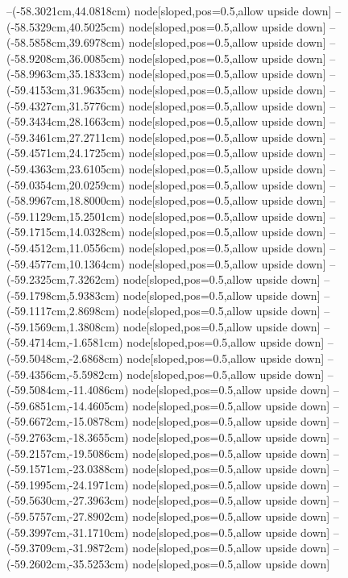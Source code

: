 --(-58.3021cm,44.0818cm) node[sloped,pos=0.5,allow upside down]{\ArrowIn}
--(-58.5329cm,40.5025cm) node[sloped,pos=0.5,allow upside down]{\ArrowIn}
--(-58.5858cm,39.6978cm) node[sloped,pos=0.5,allow upside down]{\arrowIn}
--(-58.9208cm,36.0085cm) node[sloped,pos=0.5,allow upside down]{\ArrowIn}
--(-58.9963cm,35.1833cm) node[sloped,pos=0.5,allow upside down]{\arrowIn}
--(-59.4153cm,31.9635cm) node[sloped,pos=0.5,allow upside down]{\ArrowIn}
--(-59.4327cm,31.5776cm) node[sloped,pos=0.5,allow upside down]{\arrowIn}
--(-59.3434cm,28.1663cm) node[sloped,pos=0.5,allow upside down]{\ArrowIn}
--(-59.3461cm,27.2711cm) node[sloped,pos=0.5,allow upside down]{\arrowIn}
--(-59.4571cm,24.1725cm) node[sloped,pos=0.5,allow upside down]{\ArrowIn}
--(-59.4363cm,23.6105cm) node[sloped,pos=0.5,allow upside down]{\arrowIn}
--(-59.0354cm,20.0259cm) node[sloped,pos=0.5,allow upside down]{\ArrowIn}
--(-58.9967cm,18.8000cm) node[sloped,pos=0.5,allow upside down]{\ArrowIn}
--(-59.1129cm,15.2501cm) node[sloped,pos=0.5,allow upside down]{\ArrowIn}
--(-59.1715cm,14.0328cm) node[sloped,pos=0.5,allow upside down]{\ArrowIn}
--(-59.4512cm,11.0556cm) node[sloped,pos=0.5,allow upside down]{\ArrowIn}
--(-59.4577cm,10.1364cm) node[sloped,pos=0.5,allow upside down]{\arrowIn}
--(-59.2325cm,7.3262cm) node[sloped,pos=0.5,allow upside down]{\ArrowIn}
--(-59.1798cm,5.9383cm) node[sloped,pos=0.5,allow upside down]{\ArrowIn}
--(-59.1117cm,2.8698cm) node[sloped,pos=0.5,allow upside down]{\ArrowIn}
--(-59.1569cm,1.3808cm) node[sloped,pos=0.5,allow upside down]{\ArrowIn}
--(-59.4714cm,-1.6581cm) node[sloped,pos=0.5,allow upside down]{\ArrowIn}
--(-59.5048cm,-2.6868cm) node[sloped,pos=0.5,allow upside down]{\ArrowIn}
--(-59.4356cm,-5.5982cm) node[sloped,pos=0.5,allow upside down]{\ArrowIn}
--(-59.5084cm,-11.4086cm) node[sloped,pos=0.5,allow upside down]{\ArrowIn}
--(-59.6851cm,-14.4605cm) node[sloped,pos=0.5,allow upside down]{\ArrowIn}
--(-59.6672cm,-15.0878cm) node[sloped,pos=0.5,allow upside down]{\arrowIn}
--(-59.2763cm,-18.3655cm) node[sloped,pos=0.5,allow upside down]{\ArrowIn}
--(-59.2157cm,-19.5086cm) node[sloped,pos=0.5,allow upside down]{\ArrowIn}
--(-59.1571cm,-23.0388cm) node[sloped,pos=0.5,allow upside down]{\ArrowIn}
--(-59.1995cm,-24.1971cm) node[sloped,pos=0.5,allow upside down]{\ArrowIn}
--(-59.5630cm,-27.3963cm) node[sloped,pos=0.5,allow upside down]{\ArrowIn}
--(-59.5757cm,-27.8902cm) node[sloped,pos=0.5,allow upside down]{\arrowIn}
--(-59.3997cm,-31.1710cm) node[sloped,pos=0.5,allow upside down]{\ArrowIn}
--(-59.3709cm,-31.9872cm) node[sloped,pos=0.5,allow upside down]{\arrowIn}
--(-59.2602cm,-35.5253cm) node[sloped,pos=0.5,allow upside down]{\ArrowIn}
